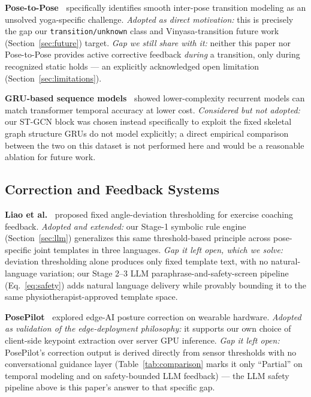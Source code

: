 \documentclass[conference]{IEEEtran}
\begin{document}
\textbf{Pose-to-Pose~\cite{pose2pose_cvprw2025}} specifically identifies smooth
inter-pose transition modeling as an unsolved yoga-specific challenge.
\emph{Adopted as direct motivation:} this is precisely the gap our
\texttt{transition/unknown} class and Vinyasa-transition future work
(Section~\ref{sec:future}) target. \emph{Gap we still share with it:} neither
this paper nor Pose-to-Pose provides active corrective feedback \emph{during}
a transition, only during recognized static holds --- an explicitly
acknowledged open limitation (Section~\ref{sec:limitations}).

\textbf{GRU-based sequence models~\cite{gru_pose_2023}} showed lower-complexity
recurrent models can match transformer temporal accuracy at lower cost.
\emph{Considered but not adopted:} our ST-GCN block was chosen instead
specifically to exploit the fixed skeletal graph structure GRUs do not model
explicitly; a direct empirical comparison between the two on this dataset is
not performed here and would be a reasonable ablation for future work.

\subsection{Correction and Feedback Systems}

\textbf{Liao et al.~\cite{action_correction_2020}} proposed fixed angle-deviation
thresholding for exercise coaching feedback. \emph{Adopted and extended:} our
Stage-1 symbolic rule engine (Section~\ref{sec:llm}) generalizes this same
threshold-based principle across pose-specific joint templates in three
languages. \emph{Gap it left open, which we solve:} deviation thresholding
alone produces only fixed template text, with no natural-language variation;
our Stage 2--3 LLM paraphrase-and-safety-screen pipeline (Eq.~\ref{eq:safety})
adds natural language delivery while provably bounding it to the same
physiotherapist-approved template space.

\textbf{PosePilot~\cite{posepilot_2025}} explored edge-AI posture correction on
wearable hardware. \emph{Adopted as validation of the edge-deployment
philosophy:} it supports our own choice of client-side keypoint extraction
over server GPU inference. \emph{Gap it left open:} PosePilot's correction
output is derived directly from sensor thresholds with no conversational
guidance layer (Table~\ref{tab:comparison} marks it only ``Partial'' on temporal
modeling and  on safety-bounded LLM feedback) --- the LLM safety
pipeline above is this paper's answer to that specific gap.
\end{document}
